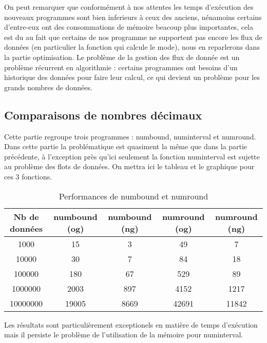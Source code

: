 On peut remarquer que conform\'ement \`a nos attentes les temps d'ex\'ecution des nouveaux programmes sont bien inferieurs \`a ceux des anciens,
 n\'enamoins certains d'entre-eux ont des consommations de m\'emoire beacoup plus importantes, cela est du au fait que certains de nos programme 
ne supportent pas encore les flux de donn\'ees (en particulier la fonction qui calcule le mode), nous en reparlerons dans la partie optimisation.
Le probl\`eme de la gestion des flux de donn\'ee est un probl\`eme r\'ecurrent en algorithmie : certains programmes ont besoins d'un historique 
des donn\'ees pour faire leur calcul, ce qui devient un probl\`eme pour les grands nombres de donn\'ees.

\subsection{Comparaisons de nombres d\'ecimaux}

Cette partie regroupe trois programmes : numbound, numinterval et numround.
\newline
Dans cette partie la probl\'ematique est quasiment la m\^eme que dans la partie pr\'ec\'edente, \`a l'exception pr\`es qu'ici seulement la fonction 
numinterval est sujette au probl\`eme des flots de donn\'ees.
\newline
On mettra ici le tableau et le graphique pour ces 3 fonctions.

\begin{table}[h]
\begin{center}
\begin{tabular}{|c|c|c|c|c|}

\hline
Nb de donn\'ees & numbound (og) & numbound (ng) & numround (og) & numround (ng) \\
\hline
1000 & 15 & 3 & 49 & 7 \\
\hline
10000 & 30 & 7 & 84 & 18 \\
\hline
100000 & 180 & 67 & 529 & 89 \\
\hline
1000000 & 2003 & 897 & 4152 & 1217 \\
\hline
10000000 & 19005 & 8669 & 42691 & 11842 \\
\hline

\end{tabular}
\caption{Performances de numbound et numround}
\end{center}
\label{tab:numbound}
\end{table}
Les r\'esultats sont particuli\`erement exceptionels en mati\`ere de temps d'ex\'ecution mais il persiste le probl\`eme de l'utilisation de la
 m\'emoire pour numinterval.



